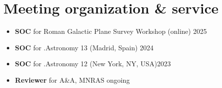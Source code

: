 \section*{Meeting organization \& service}

\begin{itemize}
    \item \textbf{SOC} for Roman Galactic Plane Survey Workshop (online) \hfill 2025
    \item \textbf{SOC} for .Astronomy 13 (Madrid, Spain) \hfill 2024
    \item \textbf{SOC} for .Astronomy 12 (New York, NY, USA)\hfill 2023
    \item \textbf{Reviewer} for A\&A, MNRAS \hfill ongoing
\end{itemize}